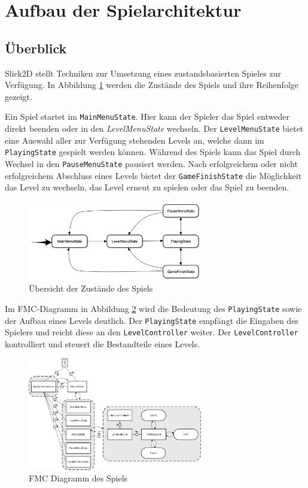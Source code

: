 \section{Aufbau der Spielarchitektur}

\subsection{Überblick}

Slick2D stellt Techniken zur Umsetzung eines zustandsbasierten Spieles zur Verfügung.
In Abbildung \ref{fig:spielarchitektur:states} werden die Zustände des Spiels und ihre Reihenfolge gezeigt.

Ein Spiel startet im \texttt{MainMenuState}.
Hier kann der Spieler das Spiel entweder direkt beenden oder in den \textit{LevelMenuState} wechseln.
Der \texttt{LevelMenuState} bietet eine Auswahl aller zur Verfügung stehenden Levels an, welche dann im \texttt{PlayingState} gespielt werden können.
Während des Spiels kann das Spiel durch Wechsel in den \texttt{PauseMenuState} pausiert werden.
Nach erfolgreichem oder nicht erfolgreichem Abschluss eines Levels bietet der \texttt{GameFinishState} die Möglichkeit das Level zu wechseln, das Level erneut zu spielen oder das Spiel zu beenden.

\begin{figure}[]
\centering
\includegraphics[width=3in]{img/05_states.png}
\caption{Übersicht der Zustände des Spiels}
\label{fig:spielarchitektur:states}
\end{figure}

Im FMC-Diagramm in Abbildung \ref{fig:spielarchitektur:fmc} wird die Bedeutung des \texttt{PlayingState} sowie der Aufbau eines Levels deutlich.
Der \texttt{PlayingState} empfängt die Eingaben des Spielers und reicht diese an den \texttt{LevelController} weiter.
Der \texttt{LevelController} kontrolliert und steuert die Bestandteile eines Levels.

\begin{figure}[]
\centering
\includegraphics[width=3in]{img/05_fmc.png}
\caption{FMC Diagramm des Spiels}
\label{fig:spielarchitektur:fmc}
\end{figure}

